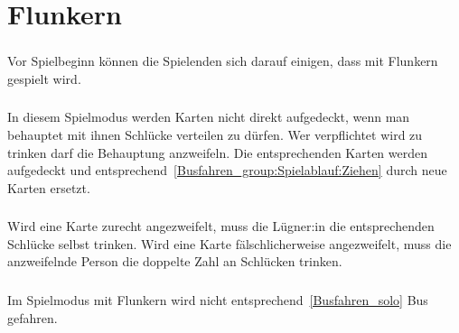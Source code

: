 \section{Flunkern}
\subsubsection{}
Vor Spielbeginn können die Spielenden sich darauf einigen, dass mit Flunkern gespielt wird.

\subsubsection{}
In diesem Spielmodus werden Karten nicht direkt aufgedeckt, wenn man behauptet mit ihnen Schlücke verteilen zu dürfen.
Wer verpflichtet wird zu trinken darf die Behauptung anzweifeln.
Die entsprechenden Karten werden aufgedeckt und entsprechend~\ref{Busfahren_group:Spielablauf:Ziehen} durch neue Karten ersetzt.

\subsubsection{}
Wird eine Karte zurecht angezweifelt, muss die Lügner:in die entsprechenden Schlücke selbst trinken.
Wird eine Karte fälschlicherweise angezweifelt, muss die anzweifelnde Person die doppelte Zahl an Schlücken trinken.

\subsubsection{}
Im Spielmodus mit Flunkern wird nicht entsprechend~\ref{Busfahren_solo} Bus gefahren.

